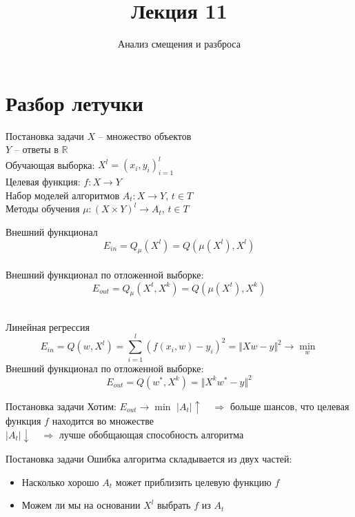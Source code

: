 \documentclass[10pt]{beamer}
\title{Лекция 11}
\subtitle{Анализ смещения и разброса}
\begin{document}
\section{Разбор летучки}

\maketitle

\begin{frame}{Постановка задачи}
  $X$ -- множество объектов \\
	$Y$ -- ответы в $\mathbb{R}$ \\
	Обучающая выборка: ${X^l = (x_i, y_i)_{i=1}^l}$ \\ 
	Целевая функция: $f: X \rightarrow Y$\\
	\bigbreak
	Набор моделей алгоритмов $A_t: X \rightarrow Y$, $t \in T$ \\
	Методы обучения $\mu: (X \times Y)^l \rightarrow A_t$, $t \in T$ \\
\end{frame}

\begin{frame}{Внешний функционал}  
  $$E_{in} = Q_{\mu}(X^l) = Q(\mu(X^l), X^l)$$\\
  \bigbreak
  Внешний функционал по отложенной выборке:\\
  $$E_{out} = Q_{\mu}(X^t, X^k) = Q(\mu(X^t), X^k)$$\\
\end{frame}

\begin{frame}{Линейная регрессия}  
  $$E_{in} = Q(w,X^l) = \sum\limits_{i=1}^l (f (x_i, w) - y_i)^2  = \Vert Xw - y \Vert^2 \rightarrow \min\limits_{w}$$
  \bigbreak
  Внешний функционал по отложенной выборке:\\
  $$E_{out} = Q(w^*,X^k) = \Vert X^k w^* - y \Vert^2$$
\end{frame}

\begin{frame}{Постановка задачи}
  \alert{Хотим}: $E_{out} \rightarrow \min $
  \bigbreak
  \pause
  $\vert A_t \vert \uparrow \quad \Rightarrow$ больше шансов, что целевая функция $f$ находится во множестве \\
  $\vert A_t \vert \downarrow \quad \Rightarrow$ лучше обобщающая способность алгоритма
\end{frame}

\begin{frame}{Постановка задачи}
  Ошибка алгоритма складывается из двух частей:
  \begin{itemize}
    \item Насколько хорошо $A_t$ может приблизить целевую функцию $f$
    \item Можем ли мы на основании $X^l$ выбрать $f$ из $A_t$
  \end{itemize}
\end{frame}
\end{document}
